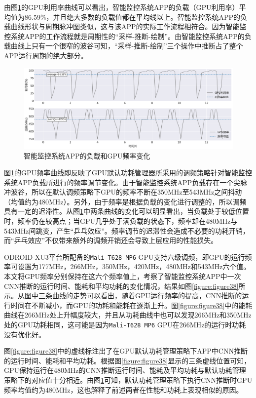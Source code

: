 由图\ref{figure:figure37}的GPU利用率曲线可以看出，智能监控系统APP的负载（GPU利用率）平均值为86.59\%，并且绝大多数的负载值都在平均线以上。智能监控系统APP的负载曲线形状与周期脉冲图类似，这与该APP的实际工作流程相符合。因为智能监控系统APP的工作流程就是周期性的“采样-推断-绘制”。由智能监控系统APP的负载曲线上只有一个很窄的波谷可知，“采样-推断-绘制”三个操作中推断占了整个APP运行周期的绝大部分。

\begin{figure}[htbp]
    \centering
    \includegraphics[width=1.0\textwidth]{figures/system_util.pdf}
    \caption{智能监控系统APP的负载和GPU频率变化}\label{figure:figure37}
\end{figure}

图\ref{figure:figure37}的GPU频率曲线即反映了GPU默认功耗管理器所采用的调频策略针对智能监控系统APP负载所进行的频率调节变化。由于智能监控系统APP负载存在一个尖脉冲波谷，所以在默认调频策略下GPU的频率不断在350MHz至543MHz之间抖动（均值约为480MHz）。另外，由于频率是根据负载的变化进行调整的，所以调频具有一定的迟滞性。从图\ref{figure:figure37}中两条曲线的变化可以明显看出，当负载处于较低位置时，频率仍在较高点；当GPU几乎处于满负载的状态下，频率却在480MHz与543MHz间跳变，产生“乒乓效应”。频率调节的迟滞性会造成不必要的功耗开销，而“乒乓效应”不仅带来额外的调频开销还会导致上层应用的性能损失。

ODROID-XU3平台所配备的\texttt{Mali-T628 MP6} GPU支持六级调频，即GPU的运行频率可设置为177MHz，266MHz，350MHz，420MHz，480MHz和543MHz六个值。本文将GPU频率分别保持在这六个频率值上，考察了智能监控系统APP中一次CNN推断的运行时间、能耗和平均功耗的变化情况，结果如图\ref{figure:figure38}所示。从图中三条曲线的走势可以看出，随着GPU运行频率的提高，CNN推断的运行时间在不断减小，而GPU的功耗和能耗在逐渐上升。图\ref{figure:figure38}中的能耗曲线在266MHz处上升幅度较大，并且从功耗曲线中也可以发现266MHz和350MHz处的GPU功耗相同，这可能是因为\texttt{Mali-T628 MP6} GPU在266MHz的运行时功耗没有优化好。

图\ref{figure:figure38}中的虚线标注出了在GPU默认功耗管理策略下APP中CNN推断的运行时间、能耗和平均功耗。根据图\ref{figure:figure38}显示的三条虚线位置可知，GPU保持运行在480MHz的CNN推断运行时间、能耗及平均功耗与默认功耗管理策略下的对应值十分相近。由图\ref{figure:figure37}可知，默认功耗管理策略下执行CNN推断时GPU频率均值约为480MHz，这也解释了前述两者在性能和功耗上表现相似的原因。

